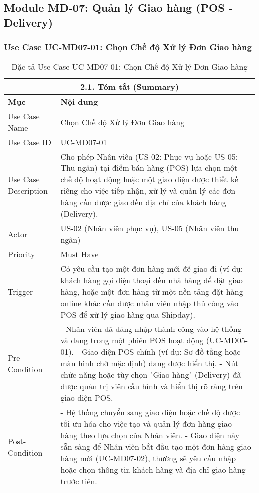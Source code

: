 \subsection{Module MD-07: Quản lý Giao hàng (POS - Delivery)}

\subsubsection{Use Case UC-MD07-01: Chọn Chế độ Xử lý Đơn Giao hàng}
\begin{longtable}{|m{4cm}|p{11cm}|}
\caption{Đặc tả Use Case UC-MD07-01: Chọn Chế độ Xử lý Đơn Giao hàng} \label{tab:uc_md07_01_final_full} \\
\hline
\multicolumn{2}{|c|}{\textbf{2.1. Tóm tắt (Summary)}} \\
\hline
\textbf{Mục} & \textbf{Nội dung} \\
\hline
\endhead %
\hline
\endfoot %
\hline
\endlastfoot %
Use Case Name & Chọn Chế độ Xử lý Đơn Giao hàng \\
\hline
Use Case ID & UC-MD07-01 \\
\hline
Use Case Description & Cho phép Nhân viên (US-02: Phục vụ hoặc US-05: Thu ngân) tại điểm bán hàng (POS) lựa chọn một chế độ hoạt động hoặc một giao diện được thiết kế riêng cho việc tiếp nhận, xử lý và quản lý các đơn hàng cần được giao đến địa chỉ của khách hàng (Delivery). \\
\hline
Actor & US-02 (Nhân viên phục vụ), US-05 (Nhân viên thu ngân) \\
\hline
Priority & Must Have \\
\hline
Trigger & Có yêu cầu tạo một đơn hàng mới để giao đi (ví dụ: khách hàng gọi điện thoại đến nhà hàng để đặt giao hàng, hoặc một đơn hàng từ một nền tảng đặt hàng online khác cần được nhân viên nhập thủ công vào POS để xử lý giao hàng qua Shipday). \\
\hline
Pre-Condition & - Nhân viên đã đăng nhập thành công vào hệ thống và đang trong một phiên POS hoạt động (UC-MD05-01). \newline - Giao diện POS chính (ví dụ: Sơ đồ tầng hoặc màn hình chờ mặc định) đang được hiển thị. \newline - Nút chức năng hoặc tùy chọn "Giao hàng" (Delivery) đã được quản trị viên cấu hình và hiển thị rõ ràng trên giao diện POS. \\
\hline
Post-Condition & - Hệ thống chuyển sang giao diện hoặc chế độ được tối ưu hóa cho việc tạo và quản lý đơn hàng giao hàng theo lựa chọn của Nhân viên. \newline - Giao diện này sẵn sàng để Nhân viên bắt đầu tạo một đơn hàng giao hàng mới (UC-MD07-02), thường sẽ yêu cầu nhập hoặc chọn thông tin khách hàng và địa chỉ giao hàng trước tiên. \\

\end{longtable}
